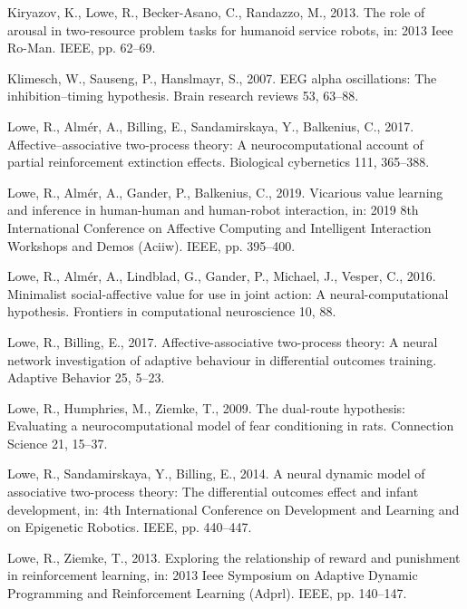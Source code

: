 \documentclass[]{elsarticle} %
\begin{document}
\leavevmode\hypertarget{ref-kiryazov2013role}{}%
Kiryazov, K., Lowe, R., Becker-Asano, C., Randazzo, M., 2013. The role
of arousal in two-resource problem tasks for humanoid service robots,
in: 2013 Ieee Ro-Man. IEEE, pp. 62--69.

\leavevmode\hypertarget{ref-klimesch2007eeg}{}%
Klimesch, W., Sauseng, P., Hanslmayr, S., 2007. EEG alpha oscillations:
The inhibition--timing hypothesis. Brain research reviews 53, 63--88.

\leavevmode\hypertarget{ref-lowe2017affective1}{}%
Lowe, R., Almér, A., Billing, E., Sandamirskaya, Y., Balkenius, C.,
2017. Affective--associative two-process theory: A neurocomputational
account of partial reinforcement extinction effects. Biological
cybernetics 111, 365--388.

\leavevmode\hypertarget{ref-lowe2019vicarious}{}%
Lowe, R., Almér, A., Gander, P., Balkenius, C., 2019. Vicarious value
learning and inference in human-human and human-robot interaction, in:
2019 8th International Conference on Affective Computing and Intelligent
Interaction Workshops and Demos (Aciiw). IEEE, pp. 395--400.

\leavevmode\hypertarget{ref-lowe2016minimalist}{}%
Lowe, R., Almér, A., Lindblad, G., Gander, P., Michael, J., Vesper, C.,
2016. Minimalist social-affective value for use in joint action: A
neural-computational hypothesis. Frontiers in computational neuroscience
10, 88.

\leavevmode\hypertarget{ref-lowe2017affective}{}%
Lowe, R., Billing, E., 2017. Affective-associative two-process theory: A
neural network investigation of adaptive behaviour in differential
outcomes training. Adaptive Behavior 25, 5--23.

\leavevmode\hypertarget{ref-lowe2009dual}{}%
Lowe, R., Humphries, M., Ziemke, T., 2009. The dual-route hypothesis:
Evaluating a neurocomputational model of fear conditioning in rats.
Connection Science 21, 15--37.

\leavevmode\hypertarget{ref-lowe2014neural}{}%
Lowe, R., Sandamirskaya, Y., Billing, E., 2014. A neural dynamic model
of associative two-process theory: The differential outcomes effect and
infant development, in: 4th International Conference on Development and
Learning and on Epigenetic Robotics. IEEE, pp. 440--447.

\leavevmode\hypertarget{ref-lowe2013exploring}{}%
Lowe, R., Ziemke, T., 2013. Exploring the relationship of reward and
punishment in reinforcement learning, in: 2013 Ieee Symposium on
Adaptive Dynamic Programming and Reinforcement Learning (Adprl). IEEE,
pp. 140--147.
\end{document}
